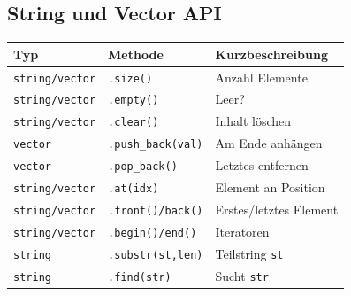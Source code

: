 \documentclass[9pt, a3paper, landscape]{article}
\begin{document}
\begin{multicols*}{4}
 \section{String und Vector API}
 \noindent
 \begin{tabularx}{\linewidth}{l l >{\RaggedRight}X}
 \toprule
\textbf{Typ} & \textbf{Methode} & \textbf{Kurzbeschreibung} \\
\midrule
\texttt{string/vector} & \lstinline|.size()| & Anzahl Elemente \\
\texttt{string/vector} & \lstinline|.empty()| & Leer? \\
\texttt{string/vector} & \lstinline|.clear()| & Inhalt löschen \\
\texttt{vector} & \lstinline|.push_back(val)| & Am Ende anhängen \\
\texttt{vector} & \lstinline|.pop_back()| & Letztes entfernen \\
\texttt{string/vector} & \lstinline|.at(idx)| & Element an Position \\
\texttt{string/vector} & \lstinline|.front()/back()| & Erstes/letztes Element \\
\texttt{string/vector} & \lstinline|.begin()/end()| & Iteratoren \\
\texttt{string} & \lstinline|.substr(st,len)| & Teilstring \lstinline|st| \ \\
\texttt{string} & \lstinline|.find(str)| & Sucht \lstinline|str| \\
\bottomrule
\end{tabularx}


\end{multicols*}
\end{document}
